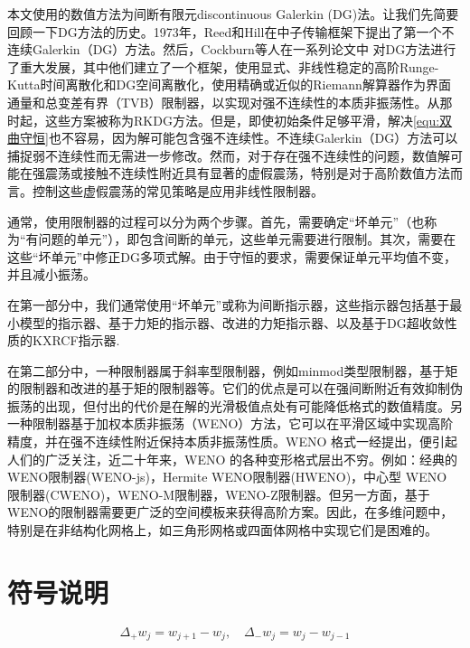\documentclass{article}
\numberwithin{equation}{subsection}    %
\begin{document}
本文使用的数值方法为间断有限元discontinuous Galerkin (DG)法。让我们先简要回顾一下DG方法的历史。1973年，Reed和Hill\cite{Reed_Hill}在中子传输框架下提出了第一个不连续Galerkin（DG）方法。然后，Cockburn等人在一系列论文中 \cite{RKDG2,RKDG3,RKDG4,RKDG5} 对DG方法进行了重大发展，其中他们建立了一个框架，使用显式、非线性稳定的高阶Runge-Kutta时间离散化和DG空间离散化，使用精确或近似的Riemann解算器作为界面通量和总变差有界（TVB）限制器\cite{TVB}，以实现对强不连续性的本质非振荡性。从那时起，这些方案被称为RKDG方法。但是，即使初始条件足够平滑，解决\eqref{equ:双曲守恒}也不容易，因为解可能包含强不连续性。不连续Galerkin（DG）方法可以捕捉弱不连续性而无需进一步修改。然而，对于存在强不连续性的问题，数值解可能在强震荡或接触不连续性附近具有显著的虚假震荡，特别是对于高阶数值方法而言。控制这些虚假震荡的常见策略是应用非线性限制器。

通常，使用限制器的过程可以分为两个步骤。首先，需要确定“坏单元”（也称为“有问题的单元”），即包含间断的单元，这些单元需要进行限制。其次，需要在这些“坏单元”中修正DG多项式解。由于守恒的要求，需要保证单元平均值不变，并且减小振荡。

在第一部分中，我们通常使用“坏单元”或称为间断指示器，这些指示器包括基于最小模型的指示器\cite{RKDG2}、基于力矩的指示器\cite{基于力矩的指示器}、改进的力矩指示器\cite{改进的基于矩的限制器}、以及基于DG超收敛性质的KXRCF指示器\cite{基于DG超收敛性质的KXRCF指示器}.

在第二部分中，一种限制器属于斜率型限制器，例如minmod类型限制器\cite{RKDG2,RKDG3,RKDG4,RKDG5}，基于矩的限制器\cite{基于矩的限制器}和改进的基于矩的限制器\cite{改进的基于矩的限制器}等。它们的优点是可以在强间断附近有效抑制伪振荡的出现，但付出的代价是在解的光滑极值点处有可能降低格式的数值精度。另一种限制器基于加权本质非振荡（WENO）方法\cite{WENO1,WENO2,WENO3,WENO4,WENO5}，它可以在平滑区域中实现高阶精度，并在强不连续性附近保持本质非振荡性质。WENO 格式一经提出，便引起人们的广泛关注，近二十年来，WENO 的各种变形格式层出不穷。例如：经典的WENO限制器(WENO-js)\cite{WENO-js1,WENO-js2}，Hermite WENO限制器(HWENO)\cite{HWENO1,HWENO2}，中心型 WENO 限制器(CWENO)\cite{CWENO}，WENO-M限制器\cite{WENO-M}，WENO-Z限制器\cite{WENO-Z}。但另一方面，基于WENO的限制器需要更广泛的空间模板来获得高阶方案。因此，在多维问题中，特别是在非结构化网格上，如三角形网格或四面体网格中实现它们是困难的。

\section{符号说明}
\begin{equation}
    \Delta_{+} w_{j}=w_{j+1}-w_{j}, \quad \Delta_{-} w_{j}=w_{j}-w_{j-1}
\end{equation}
\end{document}
